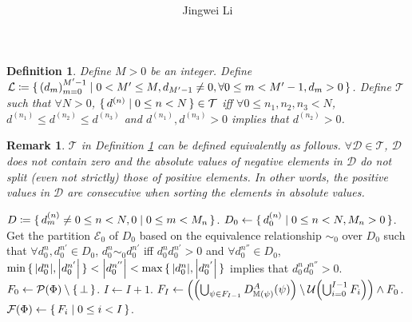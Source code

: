 \documentclass[10pt]{article}
\newtheorem{definition}{Definition}
\newtheorem{remark}{Remark}
\begin{document}
\title{
  \bf 
}

\author[1]{Jingwei Li}


%

\maketitle

\begin{definition}\label{DefData}
Define $M>0$ be an integer. Define $\mathcal{L}\coloneqq\set{\qty(d_m)_{m=0}^{M'-1} \mid 0<M'\le M, d_{M'-1}\neq 0, \forall 0\le m < M'-1, d_m > 0}$. Define $\mathcal{T}$ such that $\forall N>0$, $\set{d^{(n)} \mid 0\le n < N}\in \mathcal{T}$ iff $\forall 0\le n_1,n_2,n_3 < N$, $d^{(n_1)}\le d^{(n_2)}\le d^{(n_3)}$ and $d^{(n_1)},d^{(n_3)}>0$ implies that $d^{(n_2)}>0$.
\end{definition}

\begin{remark}
$\mathcal{T}$ in Definition \ref{DefData} can be defined equivalently as follows. $\forall \mathcal{D}\in\mathcal{T}$, $\mathcal{D}$ does not contain zero and the absolute values of negative elements in $\mathcal{D}$ do not split (even not strictly) those of positive elements. In other words, the positive values in $\mathcal{D}$ are consecutive when sorting the elements in absolute values.
\end{remark}

\begin{algorithm}
\caption{IMT}
\label{IMT}
\begin{algorithmic}[1]
\Require $D\coloneqq\set{d_m^{(n)}\neq 0\le n < N,0 \mid 0\le m < M_n}$.
\State $D_0\gets \set{d_0^{(n)} \mid 0\le n < N, M_n > 0}$.
\State Get the partition $\mathcal{E}_0$ of $D_0$ based on the equivalence relationship $\sim_0$ over $D_0$ such that $\forall d_0^n,d_0^{n'}\in D_0$, $d_0^n\sim_0 d_0^{n'}$ iff $d_0^n d_0^{n'}>0$ and $\forall d_0^{n''}\in D_0$, $\min\set{\abs{d_0^n},\abs{d_0^{n'}}}<\abs{d_0^{n''}}<\max\set{\abs{d_0^n},\abs{d_0^{n'}}}$ implies that $d_0^n d_0^{n''}>0$.
\State $F_0\gets \mathcal{P}(\Phi)\setminus\set{\bot}$.
\Repeat
\State $I\gets I+1$.
\State $F_I\gets \qty(\qty(\bigcup_{\psi\in F_{I-1}}D_{\mathbb{M}(\psi)}^A(\psi))\setminus\mathcal{U}\qty(\bigcup_{i=0}^{I-1}F_i))\land F_0$.
\State \Return $\mathcal{F}(\Phi)\gets\set{F_i \mid 0\le i< I}$.
\end{algorithmic}
\end{algorithm}





\end{document}
